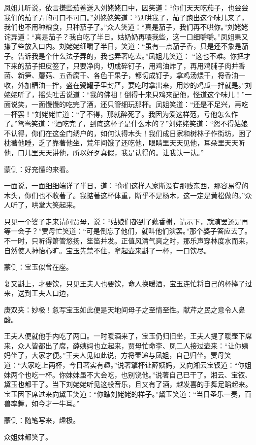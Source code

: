 \begin{parag}
凤姐儿听说，依言搛些茄鲝送入刘姥姥口中，因笑道：“你们天天吃茄子，也尝尝我们的茄子弄的可口不可口。”刘姥姥笑道：“别哄我了，茄子跑出这个味儿来了，我们也不用种粮食，只种茄子了。”众人笑道：“真是茄子，我们再不哄你。”刘姥姥诧异道：“真是茄子？我白吃了半日。姑奶奶再喂我些，这一口细嚼嚼。”凤姐果又搛了些放入口内。刘姥姥细嚼了半日，笑道：“虽有一点茄子香，只是还不象是茄子。告诉我是个什么法子弄的，我也弄著吃去。”凤姐儿笑道： “这也不难。你把才下来的茄子把皮签了，只要净肉，切成碎钉子，用鸡油炸了，再用鸡脯子肉并香菌、新笋、蘑菇、五香腐干、各色干果子，都切成钉子，拿鸡汤煨干，将香油一收，外加糟油一拌，盛在瓷罐子里封严，要吃时拿出来，用炒的鸡瓜一拌就是。”刘姥姥听了，摇头吐舌说道：“我的佛祖！倒得十来只鸡来配他，怪道这个味儿！”一面说笑，一面慢慢的吃完了酒，还只管细玩那杯。凤姐笑道：“还是不足兴，再吃一杯罢！”刘姥姥忙道：“了不得，那就醉死了。我因为爱这样范，亏他怎么作了。”鸳鸯笑道：“酒吃完了，到底这杯子是什么木的？”刘姥姥笑道：“怨不得姑娘不认得，你们在这金门绣户的，如何认得木头！我们成日家和树林子作街坊，困了枕著他睡，乏了靠著他坐，荒年间饿了还吃他，眼睛里天天见他，耳朵里天天听他，口儿里天天讲他，所以好歹真假，我是认得的。让我认一认。”\begin{note}蒙侧：好充懂的来看。\end{note}一面说，一面细细端详了半日，道：“你们这样人家断没有那贱东西，那容易得的木头，你们也不收著了。我掂著这杯体重，断乎不是杨木，这一定是黄松做的。”众人听了，哄堂大笑起来。
\end{parag}


\begin{parag}
    只见一个婆子走来请问贾母，说：“姑娘们都到了藕香榭，请示下，就演罢还是再等一会子？”贾母忙笑道：“可是倒忘了他们，就叫他们演罢。”那个婆子答应去了。不一时，只听得箫管悠扬，笙笛并发。正值风清气爽之时，那乐声穿林度水而来，自然使人神怡心旷。宝玉先禁不住，拿起壶来斟了一杯，一口饮尽。\begin{note}蒙侧：宝玉似曾在座。\end{note}复又斟上，才要饮，只见王夫人也要饮，命人换暖酒，宝玉连忙将自己的杯捧了过来，送到王夫人口边，\begin{note}庚双夹：妙极！忽写宝玉如此便是天地间母子之至情至性。献芹之民之意令人鼻酸。\end{note}王夫人便就他手内吃了两口。一时暖酒来了，宝玉仍归旧坐，王夫人提了暖壶下席来，众人皆都出了席，薛姨妈也立起来，贾母忙命李、凤二人接过壶来：“让你姨妈坐了，大家才便。”王夫人见如此说，方将壶递与凤姐，自己归坐。贾母笑道：“大家吃上两杯，今日著实有趣。”说著擎杯让薛姨妈，又向湘云宝钗道：“你姐妹两个也吃一杯。你妹妹虽不大会吃，也别饶他。”说著自己已干了。湘云、宝钗、黛玉也都干了。当下刘姥姥听见这般音乐，且又有了酒，越发喜的手舞足蹈起来。宝玉因下席过来向黛玉笑道：“你瞧刘姥姥的样子。”黛玉笑道：“当日圣乐一奏，百兽率舞，如今才一牛耳。”\begin{note}蒙侧：随笔写来，趣极。\end{note}众姐妹都笑了。
\end{parag}


